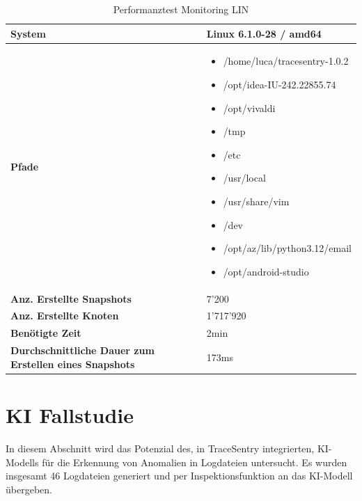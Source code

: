 \documentclass[a4paper,12pt]{report}
\begin{document}
    \begin{table}[h!]
        \centering
        \setlength{\leftmargini}{0.8cm}
        \begin{tabular}{|p{5cm}|p{10cm}|}
            \hline
            \textbf{System}                                                & Linux 6.1.0-28 / amd64 \\ \hline
            \textbf{Pfade} &
            \begin{itemize}
                \item /home/luca/tracesentry-1.0.2
                \item /opt/idea-IU-242.22855.74
                \item /opt/vivaldi
                \item /tmp
                \item /etc
                \item /usr/local
                \item /usr/share/vim
                \item /dev
                \item /opt/az/lib/python3.12/email
                \item /opt/android-studio
            \end{itemize}
            \\ \hline
            \textbf{Anz. Erstellte Snapshots}                              & 7'200                  \\ \hline
            \textbf{Anz. Erstellte Knoten}                                 & 1'717'920              \\ \hline
            \textbf{Benötigte Zeit}                                        & 2min                   \\ \hline
            \textbf{Durchschnittliche Dauer zum Erstellen eines Snapshots} & 173ms                  \\ \hline
        \end{tabular}
        \caption{Performanztest Monitoring LIN}\label{tab:perf-monitoring-lin}
    \end{table}


    \clearpage
    \section{KI Fallstudie}\label{sec:ki-fallstudie}
    In diesem Abschnitt wird das Potenzial des, in TraceSentry integrierten, KI-Modells für die Erkennung von Anomalien in Logdateien untersucht.
    Es wurden insgesamt 46 Logdateien generiert und per Inspektionsfunktion an das KI-Modell übergeben.
\end{document}
